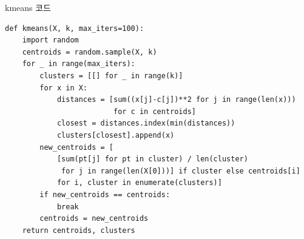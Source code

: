 \begin{frame}[fragile]{kmeans 코드}
\begin{lstlisting}
def kmeans(X, k, max_iters=100):
    import random
    centroids = random.sample(X, k)
    for _ in range(max_iters):
        clusters = [[] for _ in range(k)]
        for x in X:
            distances = [sum((x[j]-c[j])**2 for j in range(len(x)))
                         for c in centroids]
            closest = distances.index(min(distances))
            clusters[closest].append(x)
        new_centroids = [
            [sum(pt[j] for pt in cluster) / len(cluster)
             for j in range(len(X[0]))] if cluster else centroids[i]
            for i, cluster in enumerate(clusters)]
        if new_centroids == centroids:
            break
        centroids = new_centroids
    return centroids, clusters
\end{lstlisting}
  

\end{frame}
